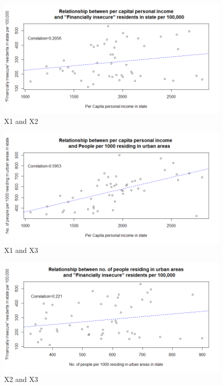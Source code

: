 \documentclass{article}
\begin{document}
\begin{figure} 
    \centering
    \includegraphics[width=1.3\textwidth]{X1 and X2.png}
    \caption{X1 and X2}
    \label{fig:enter-label}
\end{figure}

\begin{figure} 
    \centering
    \includegraphics[width=1.3\textwidth]{X1 and X3.png}
    \caption{X1 and X3}
    \label{fig:enter-label}
\end{figure}

\begin{figure} 
    \centering
    \includegraphics[width=1.3\textwidth]{X2 and X3.png}
    \caption{X2 and X3}
    \label{fig:enter-label}
\end{figure}
\end{document}
